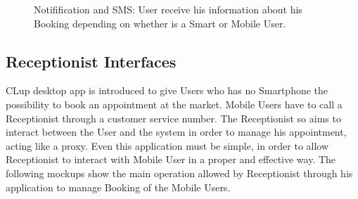\begin{figure}[H]
  \caption{Notifification and SMS: User receive his information about his Booking depending on whether is a Smart or Mobile User.}
\end{figure}



\subsection{Receptionist Interfaces}
CLup desktop app is introduced to give Users who has no Smartphone the possibility to book an appointment at the market. Mobile Users have to call a Receptionist through a customer service number. The Receptionist so aims to interact between the User and the system in order to manage his appointment, acting like a proxy. 
Even this application must be simple, in order to allow Receptionist to interact with Mobile User in a proper and effective way.
The following mockups show the main operation allowed by Receptionist through his application to manage Booking of the Mobile Users.



